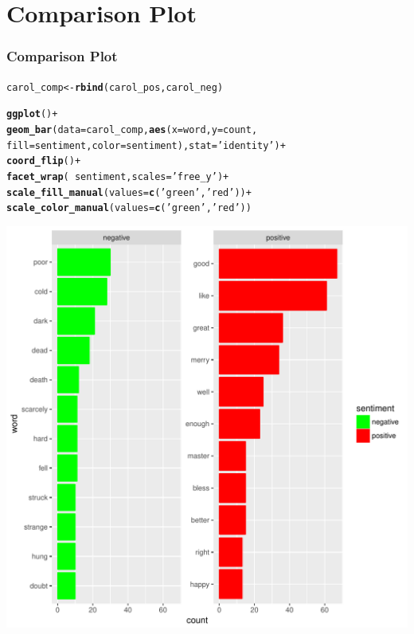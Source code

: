 \documentclass{beamer}\usepackage[]{graphicx}\usepackage[]{color}
\makeatletter
\def\maxwidth{ %
  \ifdim\Gin@nat@width>\linewidth
    \linewidth
  \else
    \Gin@nat@width
  \fi
}
\newcommand{\hlstr}[1]{\textcolor[rgb]{0.192,0.494,0.8}{#1}}%
\newcommand{\hlopt}[1]{\textcolor[rgb]{0,0,0}{#1}}%
\newcommand{\hlstd}[1]{\textcolor[rgb]{0.345,0.345,0.345}{#1}}%
\newcommand{\hlkwb}[1]{\textcolor[rgb]{0.69,0.353,0.396}{#1}}%
\newcommand{\hlkwc}[1]{\textcolor[rgb]{0.333,0.667,0.333}{#1}}%
\newcommand{\hlkwd}[1]{\textcolor[rgb]{0.737,0.353,0.396}{\textbf{#1}}}%
\newenvironment{kframe}{%
 \def\at@end@of@kframe{}%
 \ifinner\ifhmode%
  \def\at@end@of@kframe{\end{minipage}}%
  \begin{minipage}{\columnwidth}%
 \fi\fi%
 \def\FrameCommand##1{\hskip\@totalleftmargin \hskip-\fboxsep
 \colorbox{shadecolor}{##1}\hskip-\fboxsep
     \hskip-\linewidth \hskip-\@totalleftmargin \hskip\columnwidth}%
 \MakeFramed {\advance\hsize-\width
   \@totalleftmargin\z@ \linewidth\hsize
   \@setminipage}}%
 {\par\unskip\endMakeFramed%
 \at@end@of@kframe}
\newenvironment{knitrout}{}{} %
\makeatother
\begin{document}
\section{Comparison Plot}
\begin{frame}[fragile]
  \frametitle{Comparison Plot}
\begin{knitrout}
\color{fgcolor}\begin{kframe}
\begin{alltt}
\hlstd{carol_comp}\hlkwb{<-}\hlkwd{rbind}\hlstd{(carol_pos,carol_neg)}

\hlkwd{ggplot}\hlstd{()}\hlopt{+}
  \hlkwd{geom_bar}\hlstd{(}\hlkwc{data}\hlstd{=carol_comp,}\hlkwd{aes}\hlstd{(}\hlkwc{x}\hlstd{=word,}\hlkwc{y}\hlstd{=count,}
                               \hlkwc{fill}\hlstd{=sentiment,} \hlkwc{color}\hlstd{=sentiment),}\hlkwc{stat}\hlstd{=}\hlstr{'identity'}\hlstd{)}\hlopt{+}
  \hlkwd{coord_flip}\hlstd{()}\hlopt{+}
  \hlkwd{facet_wrap}\hlstd{(}\hlopt{~}\hlstd{sentiment,}\hlkwc{scales}\hlstd{=}\hlstr{'free_y'}\hlstd{)}\hlopt{+}
  \hlkwd{scale_fill_manual}\hlstd{(}\hlkwc{values}\hlstd{=}\hlkwd{c}\hlstd{(}\hlstr{'green'}\hlstd{,}\hlstr{'red'}\hlstd{))}\hlopt{+}
\hlkwd{scale_color_manual}\hlstd{(}\hlkwc{values}\hlstd{=}\hlkwd{c}\hlstd{(}\hlstr{'green'}\hlstd{,}\hlstr{'red'}\hlstd{))}
\end{alltt}
\end{kframe}
\includegraphics[width=\maxwidth]{figure/unnamed-chunk-15-1} 

\end{knitrout}

\end{frame}
\end{document}
